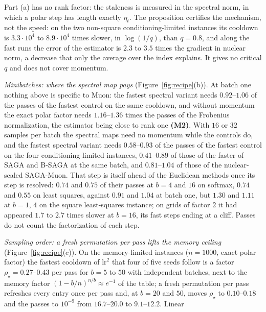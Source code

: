 \documentclass[10pt]{article}
\theoremstyle{remark}
\newcommand{\finding}[1]{\textbf{(#1)}}
\begin{document}
Part (a) has no rank factor: the staleness is measured in the spectral norm, in which a polar step has length exactly
$\eta_t$. The proposition certifies the mechanism, not the speed: on the two non-square conditioning-limited instances its
cooldown is $3.3\cdot10^4$ to $8.9\cdot10^4$ times slower, in $\log(1/q)$, than $q=0.8$, and along the fast runs the error
of the estimator is $2.3$ to $3.5$ times the gradient in nuclear norm, a decrease that only the average over the index
explains. It gives no critical $q$ and does not cover momentum.

\begin{description}[leftmargin=2.3em,labelwidth=2.0em,labelsep=0.3em,itemsep=1pt,topsep=3pt,parsep=0pt,font=\normalfont\bfseries]
\item[(M6)] \emph{Minibatches: where the spectral map pays} (Figure~\ref{fig:recipe}(b)). At batch one nothing above is
specific to Muon: the fastest spectral variant needs $0.92$--$1.06$ of the passes of the fastest control on the same
cooldown, and without momentum the exact polar factor needs $1.16$--$1.36$ times the passes of the Frobenius
normalization, the estimator being close to rank one \finding{M2}. With $16$ or $32$ samples per batch the spectral maps
need no momentum while the controls do, and the fastest spectral variant needs $0.58$--$0.93$ of the passes of the
fastest control on the four conditioning-limited instances, $0.41$--$0.89$ of those of the faster of SAGA and B-SAGA at
the same batch, and $0.81$--$1.04$ of those of the nuclear-scaled SAGA-Muon. That step is itself ahead of the Euclidean
methods once its step is resolved: $0.74$ and $0.75$ of their passes at $b=4$ and $16$ on softmax, $0.74$ and $0.55$ on
least squares, against $0.91$ and $1.04$ at batch one, but $1.30$ and $1.11$ at $b=1$, $4$ on the square least-squares
instance; on grids of factor $2$ it had appeared $1.7$ to $2.7$ times slower at $b=16$, its fast steps ending at a cliff.
Passes do not count the factorization of each step.
\item[(M7)] \emph{Sampling order: a fresh permutation per pass lifts the memory ceiling} (Figure~\ref{fig:recipe}(c)). On
the memory-limited instances ($n=1000$, exact polar factor) the fastest cooldown of $\mathrm{lr}^2$ that four of five seeds
follow is a factor $\rho_\star=0.27$--$0.43$ per pass for $b=5$ to $50$ with independent batches, next to the memory factor
$(1-b/n)^{n/b}\approx e^{-1}$ of the table; a fresh permutation per pass refreshes every entry once per pass and, at $b=20$
and $50$, moves $\rho_\star$ to $0.10$--$0.18$ and the passes to $10^{-9}$ from $16.7$--$20.0$ to $9.1$--$12.2$. Linear

\end{description}
\end{document}
